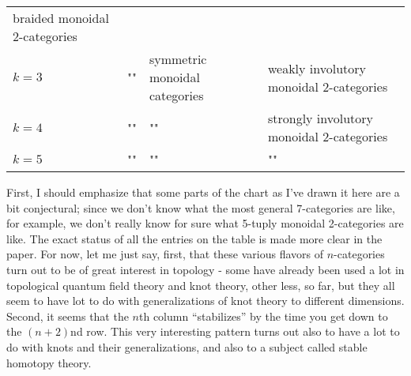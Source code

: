 \documentclass{article}
\begin{document}
\begin{longtable}[]{@{}llll@{}}
\begin{minipage}[t]{0.21\columnwidth}
braided monoidal 2-categories\strut
\end{minipage}\tabularnewline
\begin{minipage}[t]{0.26\columnwidth}\raggedright
\(k=3\)\strut
\end{minipage} & \begin{minipage}[t]{0.21\columnwidth}\raggedright
""\strut
\end{minipage} & \begin{minipage}[t]{0.21\columnwidth}\raggedright
symmetric monoidal categories\strut
\end{minipage} & \begin{minipage}[t]{0.21\columnwidth}\raggedright
weakly involutory monoidal 2-categories\strut
\end{minipage}\tabularnewline
\begin{minipage}[t]{0.26\columnwidth}\raggedright
\(k=4\)\strut
\end{minipage} & \begin{minipage}[t]{0.21\columnwidth}\raggedright
""\strut
\end{minipage} & \begin{minipage}[t]{0.21\columnwidth}\raggedright
""\strut
\end{minipage} & \begin{minipage}[t]{0.21\columnwidth}\raggedright
strongly involutory monoidal 2-categories\strut
\end{minipage}\tabularnewline
\begin{minipage}[t]{0.26\columnwidth}\raggedright
\(k=5\)\strut
\end{minipage} & \begin{minipage}[t]{0.21\columnwidth}\raggedright
""\strut
\end{minipage} & \begin{minipage}[t]{0.21\columnwidth}\raggedright
""\strut
\end{minipage} & \begin{minipage}[t]{0.21\columnwidth}\raggedright
""\strut
\end{minipage}\tabularnewline
\bottomrule
\end{longtable}

First, I should emphasize that some parts of the chart as I've drawn it
here are a bit conjectural; since we don't know what the most general
7-categories are like, for example, we don't really know for sure what
5-tuply monoidal 2-categories are like. The exact status of all the
entries on the table is made more clear in the paper. For now, let me
just say, first, that these various flavors of \(n\)-categories turn out
to be of great interest in topology - some have already been used a lot
in topological quantum field theory and knot theory, other less, so far,
but they all seem to have lot to do with generalizations of knot theory
to different dimensions. Second, it seems that the \(n\)th column
``stabilizes'' by the time you get down to the \((n+2)\)nd row. This
very interesting pattern turns out also to have a lot to do with knots
and their generalizations, and also to a subject called stable homotopy
theory.
\end{document}
